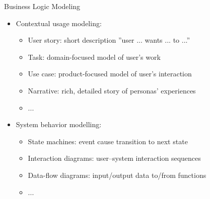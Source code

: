 \begin{Slide}{Business Logic Modeling}
\begin{itemize}
\item Contextual usage modeling:
\begin{itemize}
\item User story: short description ''user ... wants ... to ...''
\item Task: domain-focused model of user's work
\item Use case: product-focused model of user's interaction
\item Narrative: rich, detailed story of personas' experiences
\item ...
\end{itemize}
\item System behavior modelling:
\begin{itemize}
\item State machines: event cause transition to next state
\item Interaction diagrams: user--system interaction sequences
\item Data-flow diagrams: input/output data to/from functions
\item  ...

\end{itemize}
\end{itemize}
\end{Slide}